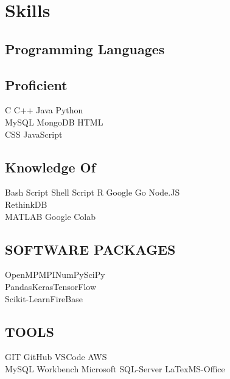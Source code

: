 \documentclass[]{imman_resume}
\begin{document}
\begin{minipage}[t]{0.33\textwidth}
\section{Skills}
\subsection{Programming Languages}
\sectionsep
\subsection{Proficient}
\sectionsep
C \textbullet{} C++ \textbullet{} Java \textbullet{} Python\\
MySQL \textbullet{} MongoDB \textbullet{} HTML \\
CSS \textbullet{} JavaScript\\ 

\sectionsep

\subsection{Knowledge Of}
\sectionsep
Bash Script \textbullet{} Shell Script \textbullet{} R\textbullet{} Google Go \textbullet{} Node.JS\\
RethinkDB \\ MATLAB \textbullet{}Google Colab  \\ 
\sectionsep

\subsection{SOFTWARE PACKAGES}
\sectionsep
OpenMP\textbullet{}MPI\textbullet{}NumPy\textbullet{}SciPy\\
Pandas\textbullet{}Keras\textbullet{}TensorFlow\\
Scikit-Learn\textbullet{}FireBase

\sectionsep
\subsection{TOOLS}
\sectionsep
GIT\textbullet{} GitHub\textbullet{} VSCode \textbullet{}AWS \\
MySQL Workbench\textbullet{} Microsoft SQL-Server\textbullet{}
LaTex\textbullet{}MS-Office\\
\sectionsep


\end{minipage} 
\hfill
\end{document}
